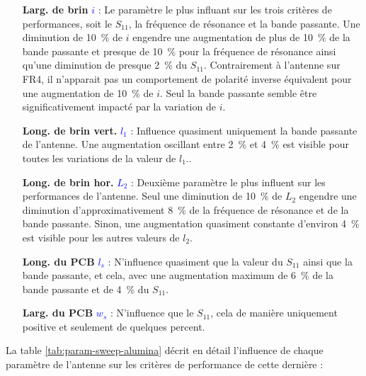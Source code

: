 \documentclass[Deriaz_Traiber_Labo02]{subfiles}
\begin{document}
\begin{itemize}
\item [\textbf{Larg. de brin }\textcolor{blue}{$i$}  ] : Le paramètre le plus influant sur les trois critères de performances, soit le $S_{11}$, la fréquence de résonance et la bande passante. Une diminution de \SI{10}{\percent} de $i$ engendre une augmentation de plus de \SI{10}{\percent} de la bande passante et presque de \SI{10}{\percent} pour la fréquence de résonance ainsi qu'une diminution de presque \SI{2}{\percent} du $S_{11}$. Contrairement à l'antenne sur FR4, il n'apparait pas un comportement de polarité inverse équivalent pour une augmentation de \SI{10}{\percent} de $i$. Seul la bande passante semble être significativement impacté par la variation de $i$.\\

\item [\textbf{Long. de brin vert. }\textcolor{blue}{$l_1$}] : Influence quasiment uniquement la bande passante de l'antenne. Une augmentation oscillant entre \SI{2}{\percent} et \SI{4}{\percent} est visible pour toutes les variations de la valeur de $l_1$..\\

\item [\textbf{Long. de brin hor.  }\textcolor{blue}{$L_2$}] : Deuxième paramètre le plus influent sur les performances de l'antenne. Seul une diminution de \SI{10}{\percent} de $L_2$ engendre une diminution d'approximativement \SI{8}{\percent} de la fréquence de résonance et de la bande passante. Sinon, une augmentation quasiment constante d'environ \SI{4}{\percent} est visible pour les autres valeurs de $l_2$.\\

\item [\textbf{Long. du PCB }\textcolor{blue}{$l_s$}] : N'influence quasiment que la valeur du $S_{11}$ ainsi que la bande passante, et cela, avec une augmentation maximum de \SI{6}{\percent} de la bande passante et de \SI{4}{\percent} du $S_{11}$.\\

\item [\textbf{Larg. du PCB  }\textcolor{blue}{$w_s$}] : N'influence que le $S_{11}$, cela de manière uniquement positive et seulement de quelques \si{percent}.\\
\end{itemize}

\pagebreak 

La table \ref{tab:param-sweep-alumina} décrit en détail l'influence de chaque paramètre de l'antenne sur les critères de performance de cette dernière :
\end{document}
